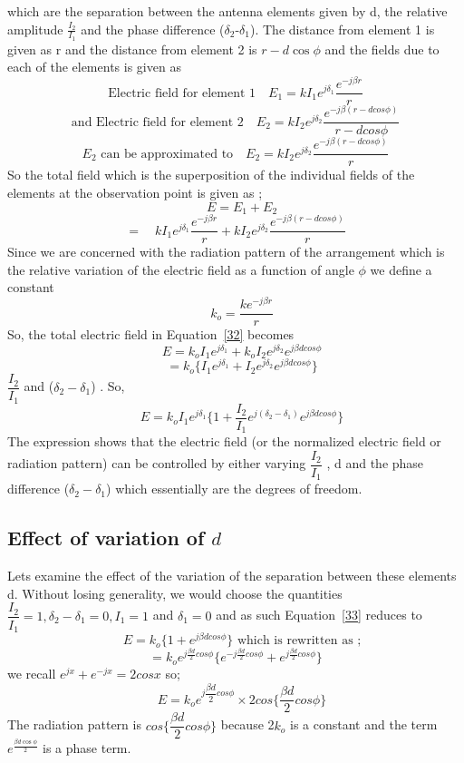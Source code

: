 which are the separation between the antenna elements given by d, the relative amplitude $\frac{I_2}{I_1}$ and the phase difference ($\delta_2$-$\delta_1$). The distance from element 1 is given as r and the distance from element 2 is $r-d\cos\phi$ and the fields due to each of the elements is given as 
$$
\text{Electric field for element 1} \quad E_1 = k I_{1} e^{j\delta_1}  \dfrac{e^{-j\beta r}}{r}  
$$ 
$$
\text{and Electric field for element 2} \quad E_2 =k I_{2} e^{j\delta_2} \dfrac{e^{-j\beta(r-dcos\phi)}}{r-dcos\phi}%
$$
$$
\text{$E_2$ can be approximated to} \quad E_2 = k I_{2}
e^{j\delta_2} \dfrac{e^{-j\beta(r-dcos\phi)}}{r}  %
$$
So the total field which is the superposition of the individual fields of the elements at the observation point is given as ;
$$
\quad E = E_1 + E_2
$$           
\begin{equation}
\label{32}                   
=  \quad k I_{1} e^{j\delta_1}\dfrac{e^{-j\beta r}}{r} + k I_{2} e^{j\delta_2} \dfrac{e^{-j\beta(r-dcos\phi)}}{r} %
\end{equation}
Since we are concerned with the radiation pattern of the arrangement which is the relative variation of the electric field as a function of angle $\phi$ we define a constant   
$$
\quad k_o =\dfrac{ke^{-j\beta r}}{r}  %
$$
So, the total electric field in Equation~\ref{32} becomes 
$$
\quad E = k_o I_1e^{j\delta_1} + k_o I_2e^{j\delta_2} e^{j\beta dcos\phi}
$$
$$
\quad = k_o \{I_1 e^{j\delta_1} + I_2 e^{j\delta_2} e^{j\beta dcos\phi}\}
$$
\quad $\dfrac{I_2}{I_1}$  {and}  ($\delta_2 - \delta_1$) . So, 
\begin{equation}
\label{33}
\quad E = k_o I_1 e^{j\delta_1} \{1 + \dfrac{I_2}{I_1} e^{j (\delta_2 - \delta_1)} e^{j\beta dcos\phi}\}
\end{equation} 
The expression shows that the electric field (or the normalized electric field or radiation pattern) can be controlled by either varying $\dfrac{I_2}{I_1}$ , d and the phase difference ($\delta_2 - \delta_1$) which essentially are the degrees of freedom.
\subsection{Effect of variation of $d$}
Lets examine the effect of the variation of the separation between these elements d. Without losing generality, we would choose the quantities $\dfrac{I_2}{I_1} = 1, \delta_2 - \delta_1 = 0 , I_1 =1 $ and $\delta_1 = 0 $ and as such Equation~\ref{33} reduces to
$$
\quad E = k_o \{1 + e^{j\beta dcos\phi}\}  \text{ which is rewritten as ;} 
$$
$$
= k_o e^{j\frac{\beta d}{2} cos\phi} \{e^{-j\frac{\beta d}{2} cos\phi} + e^{j\frac{\beta d}{2} cos\phi}\} 
$$ 
we recall $ e^{jx} + e^{-jx} = 2cosx $ so;
\begin{equation}
\quad E = k_o  e^{j\dfrac{\beta d}{2} cos\phi} \times 2 cos \{\dfrac{\beta d}{2} cos\phi\}   
\end{equation} 
The radiation pattern is $ cos\{\dfrac{\beta d}{2} cos\phi\} $ because 2$k_o $ is a constant and the term $e^{\frac{\beta d\cos\phi}{2}}$ is a phase term. 

